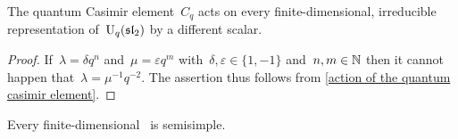 \documentclass[a4paper, 11pt, oneside]{scrartcl}
\begin{document}
\begin{corollary}
  \label{quantum casimir acts by different scalars}
  The quantum Casimir element~$C_q$ acts on every finite-dimensional, irreducible representation of~$\operatorname{U}_q(\mathfrak{sl}_2)$ by a different scalar.
\end{corollary}

\begin{proof}
  If~$\lambda = \delta q^n$ and~$\mu = \varepsilon q^m$ with~$\delta, \varepsilon \in \{1, -1\}$ and~$n, m \in \mathbb{N}$ then it cannot happen that~$\lambda = \mu^{-1} q^{-2}$.
  The assertion thus follows from \cref{action of the quantum casimir element}.
\end{proof}

\begin{theorem}
  \label{finite-dimensional quantum modules are semisimple}
  Every finite-dimensional~ is semisimple.
\end{theorem}
\end{document}
